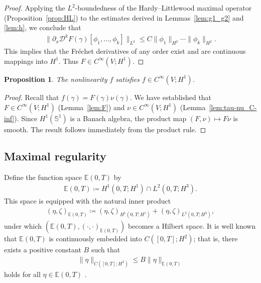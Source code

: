 \documentclass{article}
\newtheorem{proposition}[theorem]{Proposition}
\theoremstyle{remark}
\theoremstyle{definition}
\numberwithin{equation}{section}
\begin{document}
\begin{proof}
    Applying the $L^2$-boundedness of the Hardy--Littlewood maximal operator (Proposition~\ref{prop:HL}) to the estimates derived in Lemmas~\ref{lem:g1_g2} and \ref{lem:h}, we conclude that
    \begin{align*}
        \|\partial_x \mathcal{D}^k F(\gamma)[\phi_1, \ldots, \phi_k]\|_{L^2} \le C \|\phi_1\|_{H^2} \cdots \|\phi_k\|_{H^2}.
    \end{align*}
    This implies that the Fréchet derivatives of any order exist and are continuous mappings into $H^1$. Thus $F \in C^\infty(V; H^1)$.
\end{proof}

\begin{proposition}
    \label{prop:f}
    The nonlinearity $f$ satisfies $f \in C^\infty(V; H^1)$.
\end{proposition}

\begin{proof}
    Recall that $f(\gamma) = F(\gamma)\nu(\gamma)$.
    We have established that $F \in C^\infty(V; H^1)$ (Lemma~\ref{lem:F}) and $\nu \in C^\infty(V; H^1)$ (Lemma~\ref{lem:tau-nu_C-inf}).
    Since $H^1(\mathbb{S}^1)$ is a Banach algebra, the product map $(F, \nu) \mapsto F\nu$ is smooth. 
    The result follows immediately from the product rule.
\end{proof}





\subsection{Maximal regularity}

Define the function space $\mathbb{E}(0,T)$ by
\begin{align*}
    \mathbb{E}(0,T) \coloneqq H^1(0,T;H^1) \cap L^2(0,T;H^3).
\end{align*}
This space is equipped with the natural inner product
\begin{align*}
    (\eta,\zeta)_{\mathbb{E}(0,T)} \coloneqq (\eta,\zeta)_{H^1(0,T;H^1)} + (\eta,\zeta)_{L^2(0,T;H^3)},
\end{align*}
under which $(\mathbb{E}(0,T),(\cdot,\cdot)_{\mathbb{E}(0,T)})$ becomes a Hilbert space.
It is well known that $\mathbb{E}(0,T)$ is continuously embedded into $C([0,T];H^2)$;
that is, there exists a positive constant $B$ such that
\begin{align}
    \|\eta\|_{C([0,T];H^2)} \le B\|\eta\|_{\mathbb{E}(0,T)}
    \label{eq:E-C_embed}
\end{align}
holds for all $\eta\in\mathbb{E}(0,T)$ \cite[Corollary 1.14 (p.~23)]{lunardi2009interpolation}.
\end{document}
